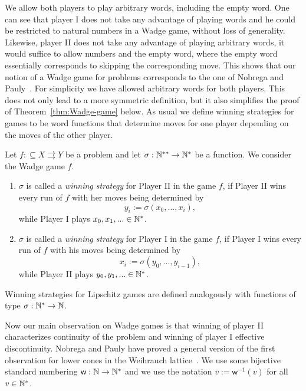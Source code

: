 \documentclass{amsart}
\def\IN{{\Bbb{N}}}
\def\In{\subseteq}
\def\mto{\rightrightarrows}
\def\w{{\mathsf{{w}}}}
\def\w{\mathsf{w}}
\begin{document}
We allow both players to play arbitrary words, including the empty word.
One can see that player I does not take any advantage of playing words and he could be restricted to natural numbers in a Wadge game, without loss of generality.
Likewise, player II does not take any advantage of playing arbitrary words, it would suffice to allow numbers and the empty word, where the empty word essentially corresponds to skipping the corresponding move.
This shows that our notion of a Wadge game for problems corresponds to the one of Nobrega and Pauly~\cite{Nob18,NP19}.
For simplicity we have allowed arbitrary words for both players.
This does not only lead to a more symmetric definition, but it also simplifies the proof of Theorem~\ref{thm:Wadge-game} below.
As usual we define winning strategies for games to be word functions that determine moves for one player depending on the
moves of the other player. 

\begin{definition}
Let $f:\In X\mto Y$ be a problem and let ${\sigma:\IN^{**}\to\IN^*}$ be a function.
We consider the Wadge game $f$.
\begin{enumerate}
\item
$\sigma$ is called a {\em winning strategy} for Player II in the game $f$, if Player II 
wins every run of $f$ with her moves being
determined by 
\[y_i:=\sigma(x_0,...,x_i),\] 
while Player I plays $x_0,x_1,...\in\IN^*$. 
\item
$\sigma$ is called a {\em winning strategy} for Player I in the game $f$, if Player I
wins every run of $f$
with his moves being determined by 
\[x_i:=\sigma(y_0,...,y_{i-1}),\] 
while Player II plays $y_0,y_1,...\in\IN^*$. 
\end{enumerate}
Winning strategies for Lipschitz games are defined analogously with functions of type $\sigma:\IN^*\to\IN$.
\end{definition}

Now our main observation on Wadge games is that winning of player II characterizes continuity of the problem
and winning of player I effective discontinuity. Nobrega and Pauly have proved a general version of the first observation for lower cones in the Weihrauch lattice~\cite[Theorem~3.3]{NP19}. 
We use some bijective standard numbering $\w:\IN\to\IN^*$ and we use the notation $\overline{v}:=\w^{-1}(v)$ for all $v\in\IN^*$.
\end{document}
